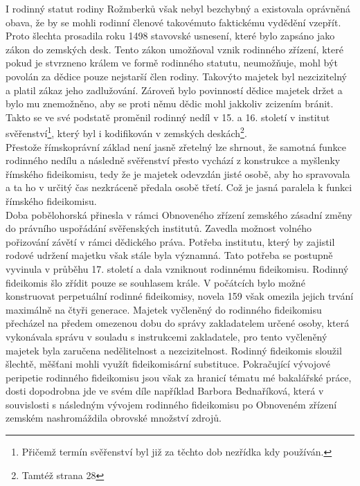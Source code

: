 \documentclass{article}
\begin{document}
I rodinný statut rodiny Rožmberků však nebyl bezchybný a existovala oprávněná obava, že by se mohli rodinní členové takovémuto faktickému vydědění vzepřít. Proto šlechta prosadila roku 1498 stavovské usnesení, které bylo zapsáno jako zákon do zemských desk. Tento zákon umožňoval vznik rodinného zřízení, které pokud je stvrzneno králem ve formě rodinného statutu, neumožňuje, mohl být povolán za dědice pouze nejstarší člen rodiny. Takovýto majetek byl nezcizitelný a platil zákaz jeho zadlužování. Zároveň bylo povinností dědice majetek držet a bylo mu znemožněno, aby se proti němu dědic mohl jakkoliv zcizením bránit. Takto se ve své podstatě proměnil rodinný nedíl v 15. a 16. století v institut svěřenství\footnote{Přičemž termín svěřenství byl již za těchto dob nezřídka kdy používán.}, který byl i kodifikován v zemských deskách\footnote{Tamtéž strana 28}.\\ 

Přestože římskoprávní základ není jasně zřetelný lze shrnout, že samotná funkce rodinného nedílu a následně svěřenství přesto vychází z konstrukce a myšlenky římského fideikomisu, tedy že je majetek odevzdán jisté osobě, aby ho spravovala a ta ho v určitý čas nezkráceně předala osobě třetí. Což je jasná paralela k funkci římského fideikomisu.\\

Doba pobělohorská přinesla v rámci Obnoveného zřízení zemského zásadní změny do právního uspořádání svěřenských institutů. Zavedla možnost volného pořizování závětí v rámci dědického práva. Potřeba institutu, který by zajistil rodové udržení majetku však stále byla významná. Tato potřeba se postupně vyvinula v průběhu 17. století a dala vzniknout rodinnému fideikomisu. Rodinný fideikomis šlo zřídit pouze se souhlasem krále. V počátcích bylo možné konstruovat perpetuální rodinné fideikomisy, novela 159 však omezila jejich trvání maximálně na čtyři generace. Majetek vyčleněný do rodinného fideikomisu přecházel na předem omezenou dobu do správy zakladatelem určené osoby, která vykonávala správu v souladu s instrukcemi zakladatele, pro tento vyčleněný majetek byla zaručena nedělitelnost a nezcizitelnost. Rodinný fideikomis sloužil šlechtě, měšťani mohli využít fideikomisární substituce. Pokračující vývojové peripetie rodinného fideikomisu jsou však za hranicí tématu mé bakalářské práce, dosti dopodrobna jde ve svém díle například Barbora Bednaříková, která v souvislosti s následným vývojem rodinného fideikomisu po Obnoveném zřízení zemském nashromáždila obrovské množství zdrojů.\\
\end{document}
